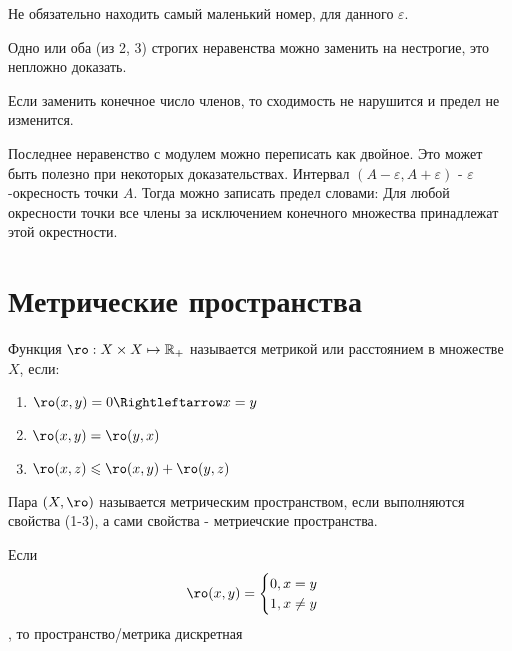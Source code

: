 \documentclass[12pt, a4paper]{article}
\begin{document}
  \begin{note}
  Не обязательно находить самый маленький номер, для данного $\varepsilon$.
  \end{note}

  \begin{note}
  Одно или оба (из 2, 3) строгих неравенства можно заменить на нестрогие, это непложно доказать.
  \end{note}

  \begin{note}
  Если заменить конечное число членов, то сходимость не нарушится и предел не изменится.
  \end{note}

  \begin{note}
  Последнее неравенство с модулем можно переписать как двойное. Это может быть полезно при некоторых доказательствах.
  Интервал $(A - \varepsilon, A + \varepsilon)$ - $\varepsilon$-окресность точки $A$.
  Тогда можно записать предел словами:
  Для любой окресности точки все члены за исключением конечного множества принадлежат этой окрестности.
  \end{note}


  \section{Метрические пространства}

  \begin{definition}
  Функция $\ro: X \times X \mapsto \sR_{+}$ называется метрикой или расстоянием в множестве $X$, если:

  \begin{enumerate}
    \item $\ro (x, y) = 0 \Rightleftarrow x = y$
    \item  $\ro (x, y) = \ro (y, x)$
    \item $\ro (x, z) \leqslant \ro (x, y) + \ro (y, z)$
  \end{enumerate}
  \end{definition}

  \begin{definition}

  Пара $(X, \ro)$ называется метрическим пространством, если выполняются свойства (1-3), а сами свойства - метриечские пространства.
  \end{definition}

  \begin{example}
  Если \begin{equation}
    \ro(x, y) = \begin{cases}
      0, x = y \\
      1, x \neq y
    \end{cases}
  \end{equation}, то пространство/метрика дискретная
  \end{example}
\end{document}

